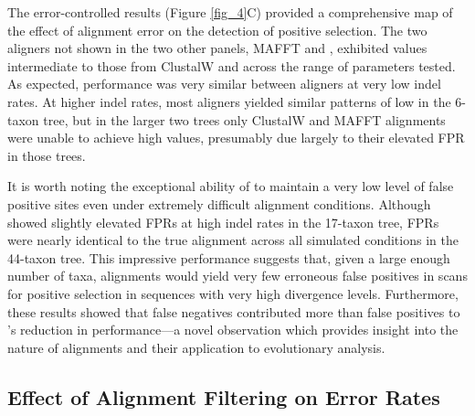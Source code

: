 \documentclass{article}
\begin{document}
The error-controlled \tpr results (Figure \ref{fig_4}C) provided a
comprehensive map of the effect of alignment error on the detection of
\sw positive selection. The two aligners not shown in the two other
panels, MAFFT and \pranka, exhibited \tpr values intermediate to those
from ClustalW and \prankc across the range of parameters tested. As
expected, performance was very similar between aligners at very low
indel rates. At higher indel rates, most aligners yielded similar
patterns of low \tpr in the 6-taxon tree, but in the larger two trees
only ClustalW and MAFFT alignments were unable to achieve high \tpr
values, presumably due largely to their elevated FPR in those trees.

It is worth noting the exceptional ability of \prankc to maintain a
very low level of false positive sites even under extremely difficult
alignment conditions. Although \prankc showed slightly elevated FPRs
at high indel rates in the 17-taxon tree, FPRs were nearly identical
to the true alignment across all simulated conditions in the 44-taxon
tree. This impressive performance suggests that, given a large enough
number of taxa, \prankc alignments would yield very few erroneous
false positives in scans for positive selection in sequences with very
high divergence levels. Furthermore, these results showed that false
negatives contributed more than false positives to \prankc{}'s
reduction in \sw performance---a novel observation which provides
insight into the nature of \prankc alignments and their application to
\sw evolutionary analysis.

\subsection*{Effect of Alignment Filtering on \Sw Error Rates}
\end{document}

